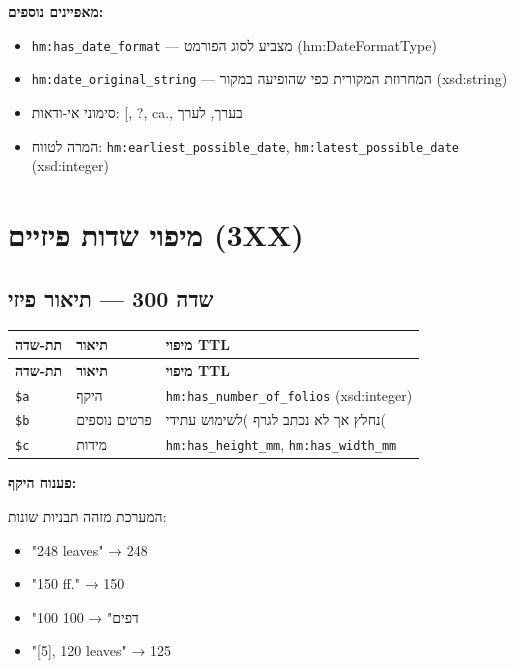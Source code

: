\documentclass[12pt,a4paper]{article}
\newcommand{\marcfield}[1]{\texttt{#1}}
\newcommand{\ttlprop}[1]{\texttt{#1}}
\begin{document}
\textbf{מאפיינים נוספים:}
\begin{itemize}
\item \ttlprop{hm:has\_date\_format} — מצביע לסוג הפורמט \textenglish{(hm:DateFormatType)}
\item \ttlprop{hm:date\_original\_string} — המחרוזת המקורית כפי שהופיעה במקור \textenglish{(xsd:string)}
\item סימוני אי-ודאות: \textenglish{[, ?, ca.}, בערך, לערך
\item המרה לטווח: \ttlprop{hm:earliest\_possible\_date}, \ttlprop{hm:latest\_possible\_date} \textenglish{(xsd:integer)}
\end{itemize}

\newpage
\section{מיפוי שדות פיזיים \textenglish{(3XX)}}

\subsection{שדה 300 — תיאור פיזי}

\begin{longtable}{|L{2.5cm}|p{4.5cm}|L{9cm}|}
\hline
\textbf{תת-שדה} & \textbf{תיאור} & \textbf{מיפוי TTL} \\
\hline
\endfirsthead
\hline
\textbf{תת-שדה} & \textbf{תיאור} & \textbf{מיפוי TTL} \\
\hline
\endhead
\hline
\endfoot
\marcfield{\$a} & היקף & \ttlprop{hm:has\_number\_of\_folios} \textenglish{(xsd:integer)} \\
\hline
\marcfield{\$b} & פרטים נוספים & נחלץ אך לא נכתב לגרף )לשימוש עתידי( \\
\hline
\marcfield{\$c} & מידות & \ttlprop{hm:has\_height\_mm}, \ttlprop{hm:has\_width\_mm} \\
\hline
\end{longtable}

\textbf{פענוח היקף:}

המערכת מזהה תבניות שונות:
\begin{itemize}
\item "248 leaves" → 248
\item "150 ff." → 150
\item "100 דפים" → 100
\item "[5], 120 leaves" → 125
\end{itemize}
\end{document}
